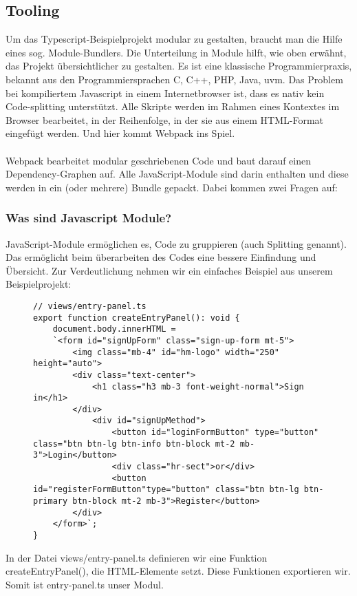 \subsection{Tooling}

Um das Typescript-Beispielprojekt modular zu gestalten, braucht man die Hilfe eines sog. \glqq Module-Bundlers\grqq{}. Die Unterteilung in Module hilft, wie oben erwähnt, das Projekt übersichtlicher zu gestalten. Es ist eine klassische Programmierpraxis, bekannt aus den Programmiersprachen C, C++, PHP, Java, uvm. Das Problem bei kompiliertem Javascript in einem Internetbrowser ist, dass es nativ kein Code-splitting unterstützt. Alle Skripte werden im Rahmen eines Kontextes im Browser bearbeitet, in der Reihenfolge, in der sie aus einem HTML-Format eingefügt werden. Und hier kommt Webpack ins Spiel. \cite{webpack-einfuehrung}
\\\\
Webpack bearbeitet modular geschriebenen Code und baut darauf einen Dependency-Graphen auf. Alle JavaScript-Module sind darin enthalten und diese werden in ein (oder mehrere) Bundle gepackt. Dabei kommen zwei Fragen auf:

\subsubsection{Was sind Javascript Module?}
JavaScript-Module ermöglichen es, Code zu gruppieren (auch \glqq{}Splitting\grqq{} genannt). Das ermöglicht beim überarbeiten des Codes eine bessere Einfindung und Übersicht. Zur Verdeutlichung nehmen wir ein einfaches Beispiel aus unserem Beispielprojekt:


\begin{figure}[H]
\begin{lstlisting}
// views/entry-panel.ts
export function createEntryPanel(): void {
    document.body.innerHTML = 
    `<form id="signUpForm" class="sign-up-form mt-5">
        <img class="mb-4" id="hm-logo" width="250" height="auto">
        <div class="text-center">
            <h1 class="h3 mb-3 font-weight-normal">Sign in</h1>
        </div>
            <div id="signUpMethod">
                <button id="loginFormButton" type="button" class="btn btn-lg btn-info btn-block mt-2 mb-3">Login</button>
                <div class="hr-sect">or</div>
                <button id="registerFormButton"type="button" class="btn btn-lg btn-primary btn-block mt-2 mb-3">Register</button>
        </div>
    </form>`;
}
\end{lstlisting}
\end{figure}
In der Datei views/entry-panel.ts definieren wir eine Funktion createEntryPanel(), die HTML-Elemente setzt. Diese Funktionen exportieren wir. Somit ist entry-panel.ts unser Modul.

